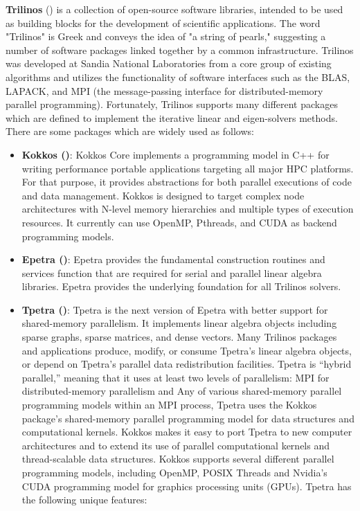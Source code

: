 \textbf{Trilinos} (\cite{heroux2005overview}) is a collection of open-source software libraries, intended to be used as building blocks for the development of scientific applications. The word "Trilinos" is Greek and conveys the idea of "a string of pearls," suggesting a number of software packages linked together by a common infrastructure. Trilinos was developed at Sandia National Laboratories from a core group of existing algorithms and utilizes the functionality of software interfaces such as the BLAS, LAPACK, and MPI (the message-passing interface for distributed-memory parallel programming). Fortunately, Trilinos supports many different packages which are defined to implement the iterative linear and eigen-solvers methods. There are some packages which are widely used as follows:

\begin{itemize}
	\item \textbf{Kokkos (\cite{edwards2014kokkos})}: Kokkos Core implements a programming model in C++ for writing performance portable applications targeting all major HPC platforms. For that purpose, it provides abstractions for both parallel executions of code and data management. Kokkos is designed to target complex node architectures with N-level memory hierarchies and multiple types of execution resources. It currently can use OpenMP, Pthreads, and CUDA as backend programming models.
	\item \textbf{Epetra (\cite{heroux2005epetra})}: Epetra provides the fundamental construction routines and services function that are required for serial and parallel linear algebra libraries. Epetra provides the underlying foundation for all Trilinos solvers.
	
	\item \textbf{Tpetra (\cite{baker2012tpetra})}: Tpetra is the next version of Epetra with better support for shared-memory parallelism. It implements linear algebra objects including sparse graphs, sparse matrices, and dense vectors.  Many Trilinos packages and applications produce, modify, or consume Tpetra’s linear algebra objects, or depend on Tpetra’s parallel data redistribution facilities. Tpetra is “hybrid parallel,” meaning that it uses at least two levels of parallelism: MPI  for distributed-memory parallelism and Any of various shared-memory parallel programming models within an MPI process, Tpetra uses the Kokkos package’s shared-memory parallel programming model for data structures and computational kernels.  Kokkos makes it easy to port Tpetra to new computer architectures and to extend its use of parallel computational kernels and thread-scalable data structures.  Kokkos supports several different parallel programming models, including OpenMP, POSIX Threads and Nvidia’s CUDA programming model for graphics processing units (GPUs). Tpetra has the following unique features:
	

\end{itemize}
